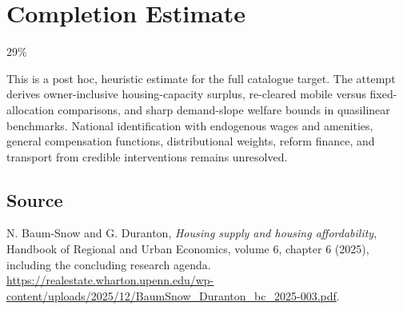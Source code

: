 \documentclass[11pt]{article}
\begin{document}
\section{Completion Estimate}
29\%

This is a post hoc, heuristic estimate for the full catalogue target.
The attempt derives owner-inclusive housing-capacity surplus, re-cleared mobile versus fixed-allocation comparisons, and sharp demand-slope welfare bounds in quasilinear benchmarks. National identification with endogenous wages and amenities, general compensation functions, distributional weights, reform finance, and transport from credible interventions remains unresolved.

\subsection*{Source}
N. Baum-Snow and G. Duranton, \emph{Housing supply and housing affordability},
Handbook of Regional and Urban Economics, volume 6, chapter 6 (2025),
including the concluding research agenda.
\url{https://realestate.wharton.upenn.edu/wp-content/uploads/2025/12/BaumSnow_Duranton_bc_2025-003.pdf}.
\end{document}
